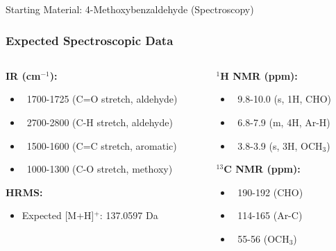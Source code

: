 \documentclass[10pt]{beamer}
\begin{document}
\begin{frame}{Starting Material: 4-Methoxybenzaldehyde (Spectroscopy)}
    \frametitle{Expected Spectroscopic Data \cite{AnisaldehydeIRSpec, AnisaldehydeNMRSpec, AnisaldehydeHRMS}}
    \begin{columns}[T] %
        \begin{column}{0.5\textwidth}
            \textbf{IR (cm$^{-1}$):}
            \begin{itemize}
                \item ~1700-1725 (C=O stretch, aldehyde)
                \item ~2700-2800 (C-H stretch, aldehyde)
                \item ~1500-1600 (C=C stretch, aromatic)
                \item ~1000-1300 (C-O stretch, methoxy)
            \end{itemize}
            \vspace{1em}
            \textbf{HRMS:}
             \begin{itemize}
                \item Expected [M+H]$^+$: 137.0597 Da
            \end{itemize}
        \end{column}
        \begin{column}{0.5\textwidth}
            \textbf{$^1$H NMR (ppm):}
            \begin{itemize}
                \item ~9.8-10.0 (s, 1H, CHO)
                \item ~6.8-7.9 (m, 4H, Ar-H)
                \item ~3.8-3.9 (s, 3H, OCH$_3$)
            \end{itemize}
            \vspace{1em}
            \textbf{$^{13}$C NMR (ppm):}
            \begin{itemize}
                \item ~190-192 (CHO)
                \item ~114-165 (Ar-C)
                \item ~55-56 (OCH$_3$)
            \end{itemize}
        \end{column}
    \end{columns}
\end{frame}
\end{document}
